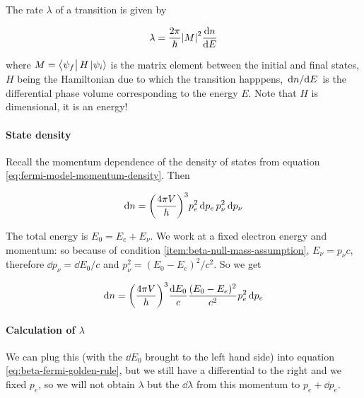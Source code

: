 \documentclass{article}
\begin{document}
The rate \(\lambda\) of a transition is given by

\begin{equation} \label{eq:beta-fermi-golden-rule}
    \lambda = \frac{2 \pi}{\hbar} \abs{M}^2 \dv{n}{E}
\end{equation}

where \(M = \bra{\psi_f} H \ket{\psi_i}  \) is the matrix element between the initial and final states, \(H\) being the Hamiltonian due to which the transition happpens, \(\dv*{n}{E} \) is the differential phase volume corresponding to the energy \(E\).
Note that \(H\) is dimensional, it is an energy!


\paragraph{State density}

Recall the momentum dependence of the density of states from equation \eqref{eq:fermi-model-momentum-density}. Then

\begin{equation}
    \dd{n} = \qty(\frac{4 \pi V}{h})^3 p^2_e \dd{p_e} p^2_\nu \dd{p_\nu}
\end{equation}

The total energy is \(E_0 = E_e + E_\nu\). We work at a fixed electron energy and momentum: so because of condition \ref{item:beta-null-mass-assumption}, \(E_\nu = p_\nu c\), therefore \(\dd{p_\nu}  = \dd{E_0} /c\) and \(p_\nu^2 = (E_0 - E_e)^2/c^2\).
So we get

\begin{equation}
    \dd{n} = \qty(\frac{4 \pi V}{h})^3 \frac{\dd{E_0}}{c} \frac{(E_0 - E_e)^2}{c^2} p^2_e \dd{p_e}
\end{equation}

\paragraph{Calculation of \(\lambda\)}

We can plug this (with the \(\dd{E_0}\) brought to the left hand side) into equation \eqref{eq:beta-fermi-golden-rule}, but we still have a differential to the right and we fixed \(p_e\), so we will not obtain \(\lambda\) but the \(\dd{\lambda}\) from this momentum to \(p_e + \dd{p_e} \).
\end{document}
